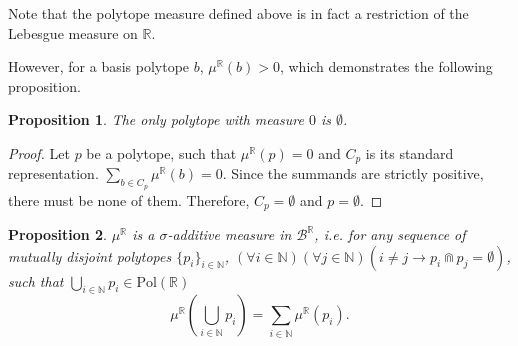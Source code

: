 \documentclass{article}
\newtheorem*{proposition}{Proposition}
\newcommand{\R}{\mathbb{R}}
\newcommand{\N}{\mathbb{N}}
\newcommand{\B}{\mathcal{B}}
\newcommand{\bcap}{\Cap}
\newcommand{\Pol}{\text{Pol}}
\begin{document}
Note that the polytope measure defined above is in fact a restriction of the Lebesgue measure on $\R$.

However, for a basis polytope $b$, $\mu^\R(b) > 0$, which demonstrates the following proposition.
\begin{proposition}
The only polytope with measure $0$ is $\emptyset$.
\end{proposition}
\begin{proof}
  Let $p$ be a polytope, such that $\mu^\R(p) = 0$ and $C_p$ is its standard representation. $\sum_{b \in C_p} \mu^\R(b) = 0$. Since the summands are strictly positive, there must be none of them. Therefore, $C_p = \emptyset$ and $p = \emptyset$.
\end{proof}

\begin{proposition}
  $\mu^\R$ is a $\sigma$-additive measure in $\B^\R$, i.e. for any sequence of mutually disjoint polytopes $\{p_i\}_{i \in \N}$, $(\forall i \in \N)(\forall j \in \N)(i \neq j \rightarrow p_i \bcap p_j = \emptyset)$, such that $\bigcup_{i \in \N}p_i \in \Pol(\R)$
  \[\mu^\R\left(\bigcup_{i \in \N}p_i\right) = \sum_{i \in \N} \mu^\R(p_i).\]
\end{proposition}
\end{document}
